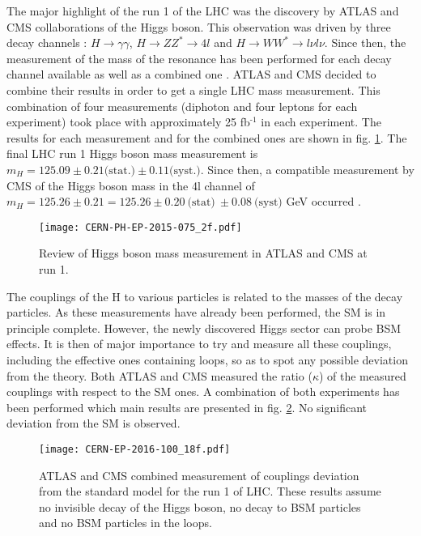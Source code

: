 The major highlight of the run 1 of the LHC was the discovery by ATLAS and CMS collaborations of the Higgs boson.
This observation was driven by three decay channels : \(H\rightarrow\gamma\gamma\), \(H\rightarrow ZZ^*\rightarrow 4l\) and \(H\rightarrow WW^* \rightarrow l\nu l\nu\).
Since then, the measurement of the mass of the resonance has been performed for each decay channel available as well as a combined one \cite{CMS-HIG-14-009,CERN-PH-EP-2014-122}.
ATLAS and CMS decided to combine \cite{CERN-PH-EP-2015-075} their results in order to get a single LHC mass measurement.
This combination of four measurements (diphoton and four leptons for each experiment) took place with approximately 25 fb\(^{\text{-1}}\) in each experiment.
The results for each measurement and for the combined ones are shown in fig. \ref{fig:orga7ceb32}.
The final LHC run 1 Higgs boson mass measurement is  \(m_H = 125.09 \pm 0.21 \text{(stat.)} \pm 0.11 \text{(syst.)}\).
Since then, a compatible measurement by CMS of the Higgs boson mass in the 4l channel of \(m_H=125.26\pm0.21=125.26 \pm 0.20\ \text{(stat)}\ \pm 0.08\ \text{(syst)}\) GeV occurred \cite{CMS-PAS-HIG-16-041,CMS-HIG-16-041}.

\begin{figure}[htbp]
\centering
\texttt{[image: CERN-PH-EP-2015-075\_2f.pdf]}
\caption{\label{fig:orga7ceb32}
Review of Higgs boson mass measurement in ATLAS and CMS at run 1. \cite{CERN-PH-EP-2015-075}}
\end{figure}

The couplings of the H to various particles is related to the masses of the decay particles.
As these measurements have already been performed, the SM is in principle complete.
However, the newly discovered Higgs sector can probe BSM effects.
It is then of major importance to try and measure all these couplings, including the effective ones containing loops, so as to spot any possible deviation from the theory.
 Both ATLAS \cite{ATLAS-CONF-2015-007} and CMS \cite{CMS-HIG-14-009} measured the ratio ($\kappa$) of the measured couplings with respect to the SM ones.
A combination of both experiments \cite{CERN-EP-2016-100} has been performed which main results are presented in fig. \ref{fig:orgfd66e48}.
No significant deviation from the SM is observed.

\begin{figure}[htbp]
\centering
\texttt{[image: CERN-EP-2016-100\_18f.pdf]}
\caption{\label{fig:orgfd66e48}
ATLAS and CMS combined measurement of couplings deviation from the standard model for the run 1 of LHC. These results assume no invisible decay of the Higgs boson, no decay to BSM particles and no BSM particles in the loops. \cite{CERN-EP-2016-100}}
\end{figure}


